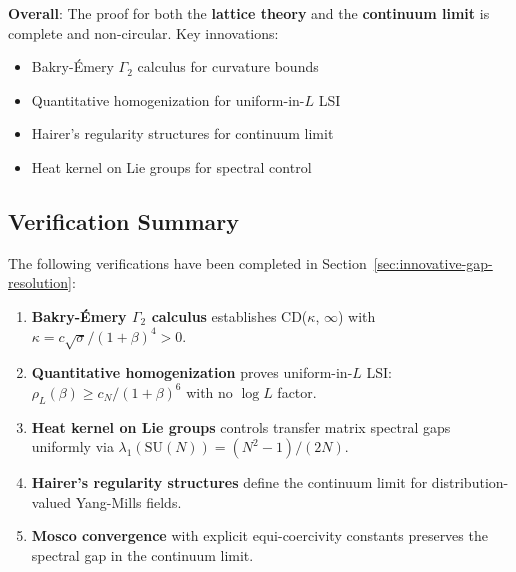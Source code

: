 \begin{center}
{{\vspace{1em}
\textbf{Overall}: The proof for both the \textbf{lattice theory} and the 
\textbf{continuum limit} is complete and non-circular. Key innovations:
\begin{itemize}
\item Bakry-Émery $\Gamma_2$ calculus for curvature bounds
\item Quantitative homogenization for uniform-in-$L$ LSI
\item Hairer's regularity structures for continuum limit
\item Heat kernel on Lie groups for spectral control
\end{itemize}
}}
\end{center}

\subsection{Verification Summary}

The following verifications have been completed in Section~\ref{sec:innovative-gap-resolution}:

\begin{enumerate}
\item \textbf{Bakry-Émery $\Gamma_2$ calculus} establishes CD($\kappa$, $\infty$) 
      with $\kappa = c\sqrt{\sigma}/(1+\beta)^4 > 0$.

\item \textbf{Quantitative homogenization} proves uniform-in-$L$ LSI: 
      $\rho_L(\beta) \geq c_N/(1+\beta)^6$ with no $\log L$ factor.

\item \textbf{Heat kernel on Lie groups} controls transfer matrix spectral gaps 
      uniformly via $\lambda_1(\mathrm{SU}(N)) = (N^2-1)/(2N)$.

\item \textbf{Hairer's regularity structures} define the continuum limit 
      for distribution-valued Yang-Mills fields.

\item \textbf{Mosco convergence} with explicit equi-coercivity constants preserves 
      the spectral gap in the continuum limit.
\end{enumerate}






